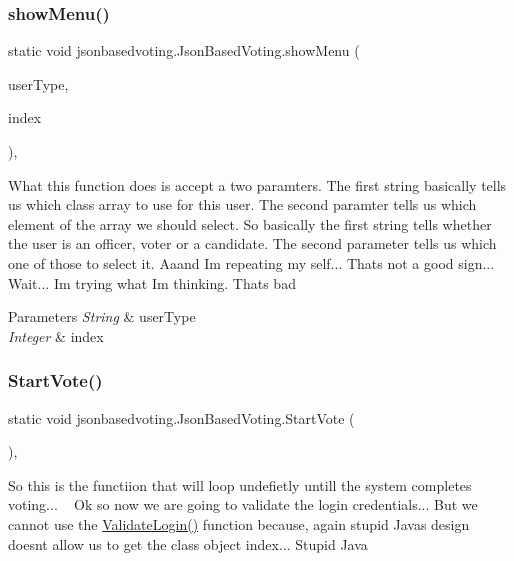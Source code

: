 \subsubsection{\texorpdfstring{showMenu()}{showMenu()}}
{\footnotesize\ttfamily static void jsonbasedvoting.\+Json\+Based\+Voting.\+show\+Menu (\begin{DoxyParamCaption}\item[{String}]{user\+Type,  }\item[{Integer}]{index }\end{DoxyParamCaption})\hspace{0.3cm}{\ttfamily [static]}, {\ttfamily [package]}}

What this function does is accept a two paramters. The first string basically tells us which class array to use for this user. The second paramter tells us which element of the array we should select. So basically the first string tells whether the user is an officer, voter or a candidate. The second parameter tells us which one of those to select it. Aaand Im repeating my self... That\textquotesingle{}s not a good sign... Wait... Im trying what Im thinking. That\textquotesingle{}s bad 
\begin{DoxyParams}{Parameters}
{\em String} & user\+Type \\
\hline
{\em Integer} & index \\
\hline
\end{DoxyParams}
\mbox{\label{classjsonbasedvoting_1_1_json_based_voting_af1f7fe5298bdbc867a4d9ebc3fc2fe17}} 
\subsubsection{\texorpdfstring{StartVote()}{StartVote()}}
{\footnotesize\ttfamily static void jsonbasedvoting.\+Json\+Based\+Voting.\+Start\+Vote (\begin{DoxyParamCaption}{ }\end{DoxyParamCaption})\hspace{0.3cm}{\ttfamily [static]}, {\ttfamily [package]}}

So this is the functiion that will loop undefietly untill the system completes voting... ~\newline
 Ok so now we are going to validate the login credentials... But we cannot use the \mbox{\hyperlink{classjsonbasedvoting_1_1_json_based_voting_a894522ca8e7dce00b4b55f8db6b102fe}{Validate\+Login()}} function because, again stupid Javas design doesn\textquotesingle{}t allow us to get the class object index... Stupid Java \mbox{\label{classjsonbasedvoting_1_1_json_based_voting_a894522ca8e7dce00b4b55f8db6b102fe}} 
